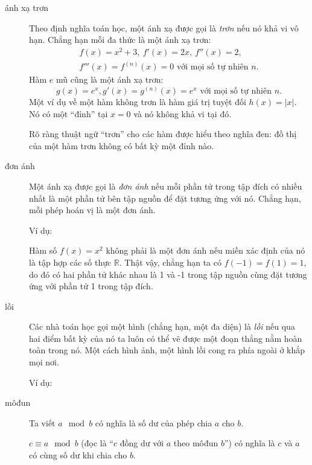 \begin{description}
	\item[ánh xạ trơn] Theo định nghĩa toán học, một ánh xạ được gọi là \emph{trơn} nếu nó khả vi vô hạn. Chẳng hạn mỗi đa thức là một ánh xạ trơn:
			\begin{gather*}
				f(x) = x^2 + 3,\ f'(x) = 2x,\ f''(x) = 2,\\
				f'''(x) = f^{(n)}(x) = 0 \text{ với mọi số tự nhiên } n.
			\end{gather*}
			Hàm $e$ mũ cũng là một ánh xạ trơn: 
			\begin{equation*}
				g(x) = e^x, g'(x) = g^{(n)}(x) = e^x \text{ với mọi số tự nhiên } n.
			\end{equation*}
			Một ví dụ về một hàm không trơn là hàm giá trị tuyệt đối $h(x) = |x|.$ Nó có một \enquote{đỉnh} tại $x=0$ và nó không khả vi tại đó.

			Rõ ràng thuật ngữ \enquote{trơn} cho các hàm được hiểu theo nghĩa đen: đồ thị của một hàm trơn không có bất kỳ một đỉnh nào.

	\item[đơn ánh] Một ánh xạ được gọi là \emph{đơn ánh} nếu mỗi phần tử trong tập đích có nhiều nhất là một phần tử bên tập nguồn để đặt tương ứng với nó. Chẳng hạn, mỗi phép hoán vị là một đơn ánh. 

		Ví dụ:
		\begin{figure}
			\def\svgwidth{200pt} 
			 
		\end{figure}
		Hàm số $f(x) = x^2$ không phải là một đơn ánh nếu miền xác định của nó là tập hợp các số thực $\mathbb R$. Thật vậy, chẳng hạn ta có $f(-1) = f(1) = 1$, do đó có hai phần tử khác nhau là 1 và -1 trong tập nguồn cùng đặt tương ứng với phần tử 1 trong tập đích.

	\item[lồi] Các nhà toán học gọi một hình (chẳng hạn, một đa diện) là \emph{lồi} nếu qua hai điểm bất kỳ của nó ta luôn có thể vẽ được một đoạn thẳng nằm hoàn toàn trong nó. Một cách hình ảnh, một hình lồi cong ra phía ngoài ở khắp mọi nơi.

		Ví dụ: 
		\begin{figure} 
			\def\svgwidth{270pt} 
			 
		\end{figure}

	\item[môđun] Ta viết $a \mod b$ có nghĩa là số dư của phép chia $a$ cho $b$. 

		$c\equiv a \mod b$ (đọc là \enquote{$c$ đồng dư với $a$ theo môđun $b$}) có nghĩa là $c$ và $a$ có cùng số dư khi chia cho $b$. 


\end{description}
